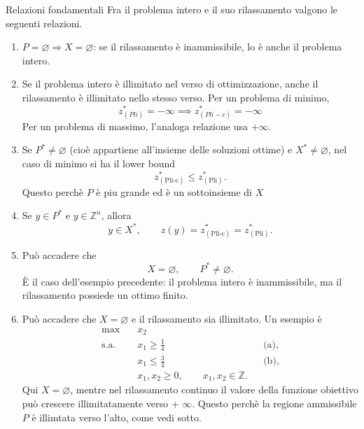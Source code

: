 \begin{proposition}{Relazioni fondamentali}
Fra il problema intero e il suo rilassamento valgono le seguenti relazioni.
\begin{enumerate}
\item \(P=\varnothing\Longrightarrow X=\varnothing\):
se il rilassamento è inammissibile, lo è anche il problema intero.

\item Se il problema intero è illimitato nel verso di ottimizzazione,
anche il rilassamento è illimitato nello stesso verso.
Per un problema di minimo,
\[
z^*_{(Pli)} = -\infty \implies z^*_{(Pli-c)} = -\infty  
\]
Per un problema di massimo, l'analoga relazione usa \(+\infty\).

\item Se \(P^*\neq\varnothing\) (cioè appartiene all'insieme delle soluzioni ottime) e \(X^*\neq\varnothing\), nel caso
di minimo si ha il lower bound
\[
z^*_{(\mathrm{Pli\text{-}c})}\leq z^*_{(\mathrm{Pli})}.
\]
Questo perchè $P$ è piu grande ed è un sottoinsieme di $X$


\item Se \(y\in P^*\) e \(y\in\mathbb Z^n\), allora
\[
y\in X^*,\qquad
z(y)=z^*_{(\mathrm{Pli\text{-}c})}=z^*_{(\mathrm{Pli})}.
\]

\item Può accadere che
\[
X=\varnothing,\qquad P^*\neq\varnothing.
\]
È il caso dell'esempio precedente: il problema intero è inammissibile,
ma il rilassamento possiede un ottimo finito.

\item Può accadere che \(X=\varnothing\) e il rilassamento sia illimitato.
Un esempio è
\begin{align*}
\max\quad &x_2\\
\text{s.a.}\quad
&x_1\geq\frac14 &&\text{(a)},\\
&x_1\leq\frac34 &&\text{(b)},\\
&x_1,x_2\geq0,\qquad x_1,x_2\in\mathbb Z.
\end{align*}
Qui \(X=\varnothing\), mentre nel rilassamento continuo il valore della funzione obiettivo può crescere illimitatamente verso + $\infty$.
Questo perchè la regione ammissibile $P$ è illimtata verso l'alto, come vedi sotto.
\end{enumerate}
\end{proposition}



